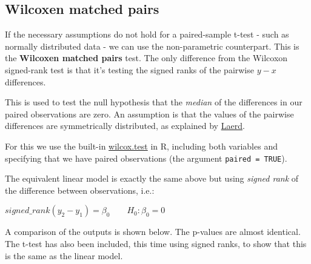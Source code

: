 \documentclass[
  12pt,
]{krantz}
\begin{document}
\hypertarget{wilcoxen-matched-pairs}{%
\subsection{Wilcoxen matched pairs}\label{wilcoxen-matched-pairs}}

If the necessary assumptions do not hold for a paired-sample t-test - such as normally distributed data - we can use the non-parametric counterpart. This is the \textbf{Wilcoxen matched pairs} test. The only difference from the Wilcoxon signed-rank test is that it's testing the signed ranks of the pairwise \(y−x\) differences.

This is used to test the null hypothesis that the \emph{median} of the differences in our paired observations are zero. An assumption is that the values of the pairwise differences are symmetrically distributed, as explained by \href{https://statistics.laerd.com/spss-tutorials/wilcoxon-signed-rank-test-using-spss-statistics.php}{Laerd}.

For this we use the built-in \href{https://www.rdocumentation.org/packages/stats/versions/3.5.3/topics/wilcox.test}{wilcox.test} in R, including both variables and specifying that we have paired observations (the argument \texttt{paired\ =\ TRUE}).

The equivalent linear model is exactly the same above but using \emph{signed rank} of the difference between observations, i.e.:

\begin{center}

\(signed\_rank(y_2 - y_1) = \beta_0 \qquad H_0: \beta_0 = 0\)

\end{center}

A comparison of the outputs is shown below. The p-values are almost identical. The t-test has also been included, this time using signed ranks, to show that this is the same as the linear model.
\end{document}
